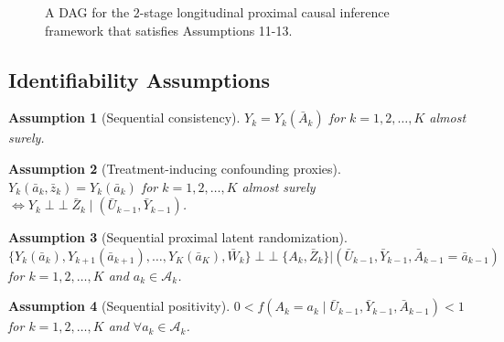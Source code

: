 \documentclass[10pt]{article}
\DeclareMathOperator*{\pperp}{\perp \!\!\! \perp}
\newtheorem{ass}{Assumption}
\theoremstyle{remark} \newtheorem{rem}{Remark}
\begin{document}
\begin{figure}[htb]
    \caption{A DAG for the $2$-stage longitudinal proximal causal inference framework that satisfies Assumptions 11-13.} 
    \label{fig: 2SDTR}
\end{figure}


\subsection{Identifiability Assumptions}
\begin{ass}[Sequential consistency]
    $Y_k = Y_k(\bar A_k)$ for $k=1,2,\ldots,K$ almost surely.
    \label{ass10}
\end{ass}

\begin{ass}[Treatment-inducing confounding proxies]
    $Y_k(\bar a_k, \bar z_k) = Y_k(\bar a_k)$ for $k=1,2,\ldots,K$ almost surely
    $\Longleftrightarrow Y_k \pperp \bar Z_k \mid (\bar U_{k-1}, \bar Y_{k-1})$.
    \label{ass12}
\end{ass}

\begin{ass}[Sequential proximal latent randomization]
    $\{Y_k(\bar a_k), Y_{k+1}(\bar a_{k+1}), \ldots, Y_K(\bar a_K), \bar W_k\} \pperp \{A_k,\bar Z_k\}|(\bar U_{k-1}, \bar Y_{k-1}, \bar A_{k-1}=\bar a_{k-1})$ for $k=1,2,\ldots,K$ and $a_k \in \mathcal{A}_k$.
    \label{ass13}
\end{ass}

\begin{ass}[Sequential positivity]
    $0< f(A_k=a_k \mid \bar U_{k-1}, \bar Y_{k-1}, \bar A_{k-1}) < 1$ for $k=1,2,\ldots,K$ and $\forall a_k \in \mathcal{A}_k$.
    \label{ass14}
\end{ass}
\end{document}
